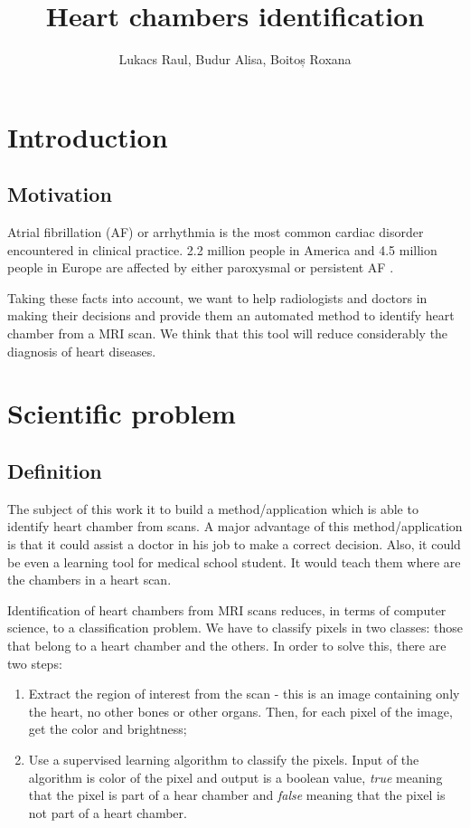 \documentclass[12pt]{report}
\title{\textbf{Heart chambers identification}}
\author{Lukacs Raul, Budur Alisa, Boitoș Roxana}
\begin{document}
\maketitle
\setlength{\parindent}{1cm}

\begin{abstract}

\end{abstract}
\tableofcontents{}

\chapter{Introduction}
\section{Motivation}
Atrial fibrillation (AF) or arrhythmia is the most common cardiac disorder encountered in clinical practice. 2.2 million people in America and 4.5 million people in Europe are affected by either paroxysmal or persistent AF \cite{sankaranarayanan1}. 

Taking these facts into account, we want to help radiologists and doctors in making their decisions and provide them an automated method to identify heart chamber from a MRI scan. We think that this tool will reduce considerably the diagnosis of heart diseases. 

\chapter{Scientific problem}
\section{Definition}
The subject of this work it to build a method/application which is able to identify heart chamber from scans. A major advantage of this method/application is that it could assist a doctor in his job to make a correct decision. Also, it could be even a learning tool for medical school student. It would teach them where are the chambers in a heart scan.

Identification of heart chambers from MRI scans reduces, in terms of computer science, to a classification problem. We have to classify pixels in two classes: those that belong to a heart chamber and the others.  In order to solve this, there are two steps:

\begin{enumerate}
	\item Extract the region of interest from the scan - this is an image containing only the heart, no other bones or other organs. Then, for each pixel of the image, get the color and brightness;
	\item  Use a supervised learning algorithm to classify the pixels. Input of the algorithm is color of the pixel and output is a boolean value, \textit{true} meaning that the pixel is part of a hear chamber and  \textit{false} meaning that the pixel is not part of a heart chamber.
\end{enumerate}
\end{document}
